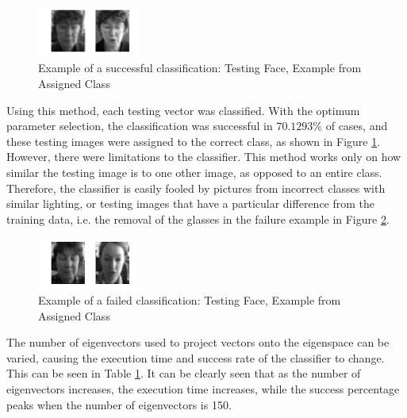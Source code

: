 \documentclass[10pt,twocolumn,letterpaper]{article}
\begin{document}
\begin{figure}[H]
\begin{center}
  
    \includegraphics[width=0.3\textwidth]{../results/Q2B_NN_success}

  \caption{Example of a successful classification: Testing Face, Example from Assigned Class \label{fig:Q2B_NN_success}}

\end{center}
\end{figure}

Using this method, each testing vector was classified. With the optimum parameter selection, the classification was successful in $70.1293\%$ of cases, and these testing images were assigned to the correct class, as shown in Figure \ref{fig:Q2B_NN_success}. However, there were limitations to the classifier. This method works only on how similar the testing image is to one other image, as opposed to an entire class. Therefore, the classifier is easily fooled by pictures from incorrect classes with similar lighting, or testing images that have a particular difference from the training data, i.e. the removal of the glasses in the failure example in Figure \ref{fig:Q2B_NN_failure}.


\begin{figure}[H]
\begin{center}
  
    \includegraphics[width=0.3\textwidth]{../results/Q2B_NN_failure}

  \caption{Example of a failed classification: Testing Face, Example from Assigned Class \label{fig:Q2B_NN_failure}}

\end{center}
\end{figure}

The number of eigenvectors used to project vectors onto the eigenspace can be varied, causing the execution time and success rate of the classifier to change. This can be seen in Table  \ref{fig:Q2B_NN_success}. It can be clearly seen that as the number of eigenvectors increases, the execution time increases, while the success percentage peaks when the number of eigenvectors is 150.
\end{document}
